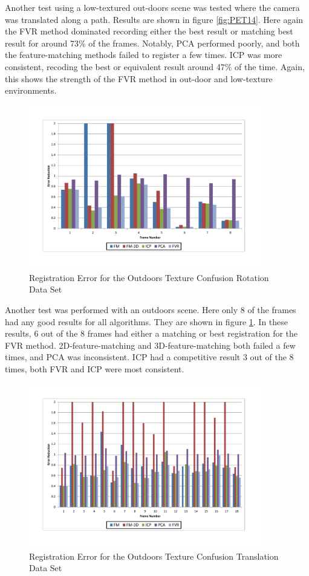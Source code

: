 Another test using a low-textured out-doors scene was tested where the camera was translated along a path. Results are shown in figure \ref{fig:PET14}. Here again the FVR method dominated recording either the best result or matching best result for around 73\% of the frames. Notably, PCA performed poorly, and both the feature-matching methods failed to register a few times. ICP was more consistent, recoding the best or equivalent result around 47\% of the time. Again, this shows the strength of the FVR method in out-door and low-texture environments. 

\begin{figure}[!htb]
\centering
\includegraphics[width=4.0in]{images/results/Outside_TextureConfusion_Rotation}
\caption{Registration Error for the Outdoors Texture Confusion Rotation Data Set}
\label{fig:PET15}
\end{figure}

Another test was performed with an outdoors scene. Here only 8 of the frames had any good results for all algorithms. They are shown in figure \ref{fig:PET15}. In these results, 6 out of the 8 frames had either a matching or best registration for the FVR method. 2D-feature-matching and 3D-feature-matching both failed a few times, and PCA was inconsistent. ICP had a competitive result 3 out of the 8 times, both FVR and ICP were most consistent. 

\begin{figure}[!htb]
\centering
\includegraphics[width=4.0in]{images/results/Outside_TextureConfusion_Translation}
\caption{Registration Error for the Outdoors Texture Confusion Translation Data Set}
\label{fig:PET16}
\end{figure}

